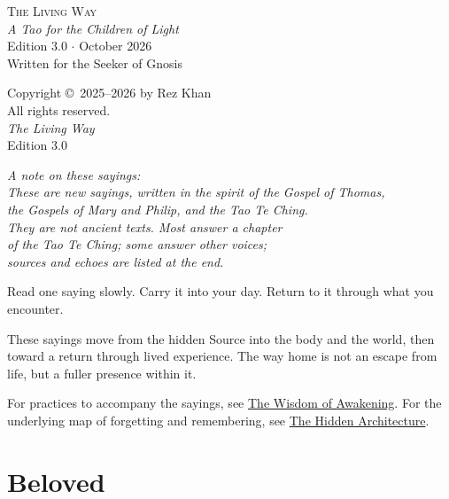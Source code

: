 \documentclass[10pt, openright]{book}
\begin{document}
\begin{titlepage}
    \centering
    \vspace*{1.5cm}
    {\Huge \textsc{The Living Way}} \\
    \vspace{0.8cm}
    {\large \emph{A Tao for the Children of Light}} \\
    \vspace{2cm}
    {\small Edition 3.0 \(\cdot\) October 2026} \\
    \vfill
    {\small Written for the Seeker of Gnosis}
    \vspace{1cm}
\end{titlepage}

\newpage
\thispagestyle{empty}
\vspace*{\fill}
\begin{center}
    \small
Copyright ©~2025--2026 by Rez Khan\\
All rights reserved.\\
\emph{The Living Way}\\
Edition 3.0

\emph{A note on these sayings:}\\
\emph{These are new sayings, written in the spirit of the Gospel of Thomas,}\\
\emph{the Gospels of Mary and Philip, and the Tao Te Ching.}\\
\emph{They are not ancient texts. Most answer a chapter}\\
\emph{of the Tao Te Ching; some answer other voices;}\\
\emph{sources and echoes are listed at the end.}

Read one saying slowly. Carry it into your day. Return to it through what you encounter.

These sayings move from the hidden Source into the body and the world, then toward a return through lived experience. The way home is not an escape from life, but a fuller presence within it.

For practices to accompany the sayings, see \href{The_Living_Suttas.html}{The Wisdom of Awakening}. For the underlying map of forgetting and remembering, see \href{The_Living_Architecture.html}{The Hidden Architecture}.
\end{center}
\vspace{1cm}
\newpage

\frontmatter
\tableofcontents

\chapter{Beloved}\label{beloved}
\end{document}
